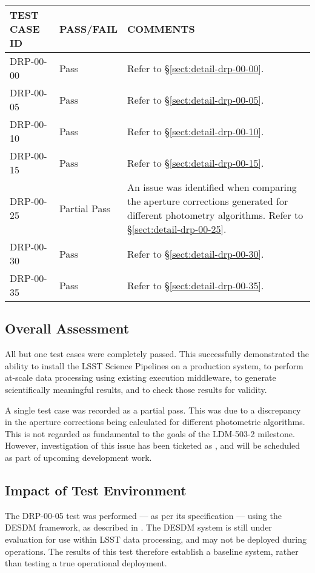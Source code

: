 \documentclass[DM,lsstdraft,STR,toc]{lsstdoc}
\begin{document}
\begin{longtable} {|p{}|p{}|p{}|}\hline
{\bf TEST CASE ID} & {\bf PASS/FAIL} & {\bf COMMENTS} \\\hline
DRP-00-00 & Pass & Refer to \S\ref{sect:detail-drp-00-00}. \\\hline
DRP-00-05 & Pass & Refer to \S\ref{sect:detail-drp-00-05}. \\\hline
DRP-00-10 & Pass & Refer to \S\ref{sect:detail-drp-00-10}. \\\hline
DRP-00-15 & Pass & Refer to \S\ref{sect:detail-drp-00-15}. \\\hline
DRP-00-25 & Partial Pass & An issue was identified when comparing the aperture corrections generated for different photometry algorithms. Refer to \S\ref{sect:detail-drp-00-25}. \\\hline
DRP-00-30 & Pass & Refer to \S\ref{sect:detail-drp-00-30}. \\\hline
DRP-00-35 & Pass & Refer to \S\ref{sect:detail-drp-00-35}. \\\hline
\end{longtable}

\subsection{Overall Assessment}
\label{sect:overallassessment}

All but one test cases were completely passed.
This successfully demonstrated the ability to install the LSST Science Pipelines on a production system, to perform at-scale data processing using existing execution middleware, to generate scientifically meaningful results, and to check those results for validity.

A single test case was recorded as a partial pass.
This was due to a discrepancy in the aperture corrections being calculated for different photometric algorithms.
This is not regarded as fundamental to the goals of the LDM-503-2 milestone.
However, investigation of this issue has been ticketed as , and will be scheduled as part of upcoming development work.

\subsection{Impact of Test Environment}
\label{sect:impact}

The DRP-00-05 test was performed --- as per its specification --- using the DESDM framework, as described in .
The DESDM system is still under evaluation for use within LSST data processing, and may not be deployed during operations.
The results of this test therefore establish a baseline system, rather than testing a true operational deployment.
\end{document}
